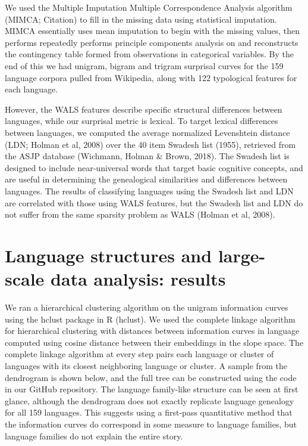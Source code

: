 \documentclass[11pt,]{article}
\begin{document}
We used the Multiple Imputation Multiple Correspondence Analysis algorithm (MIMCA; Citation) to fill in the missing data using statistical imputation. MIMCA essentially uses mean imputation to begin with the missing values, then performs repeatedly performs principle components analysis on and reconstructs the contingency table formed from observations in categorical variables. By the end of this we had unigram, bigram and trigram surprisal curves for the 159 language corpora pulled from Wikipedia, along with 122 typological features for each language.

However, the WALS features describe specific structural differences between languages, while our surprisal metric is lexical. To target lexical differences between languages, we computed the average normalized Levenshtein distance (LDN; Holman et al, 2008) over the 40 item Swadesh list (1955), retrieved from the ASJP database (Wichmann, Holman \& Brown, 2018). The Swadesh list is designed to include near-universal words that target basic cognitive concepts, and are useful in determining the genealogical similarities and differences between languages. The results of classifying languages using the Swadesh list and LDN are correlated with those using WALS features, but the Swadesh list and LDN do not suffer from the same sparsity problem as WALS (Holman et al, 2008).

\hypertarget{language-structures-and-large-scale-data-analysis-results}{%
\section{Language structures and large-scale data analysis: results}\label{language-structures-and-large-scale-data-analysis-results}}

We ran a hierarchical clustering algorithm on the unigram information curves using the hclust package in R (hclust). We used the complete linkage algorithm for hierarchical clustering with distances between information curves in language computed using cosine distance between their embeddings in the slope space. The complete linkage algorithm at every step pairs each language or cluster of languages with its closest neighboring language or cluster. A sample from the dendrogram is shown below, and the full tree can be constructed using the code in our GitHub repository. The language family-like structure can be seen at first glance, although the dendrogram does not exactly replicate language genealogy for all 159 languages. This suggests using a first-pass quantitative method that the information curves do correspond in some measure to language families, but language families do not explain the entire story.
\end{document}
